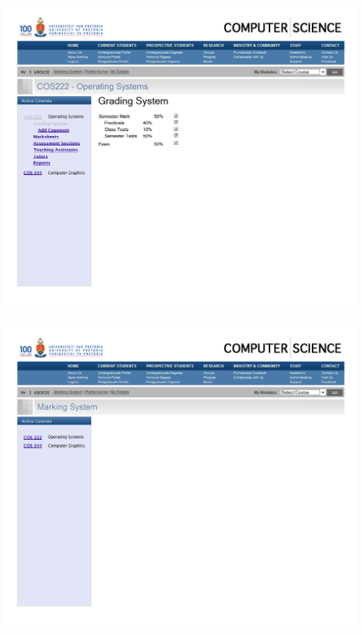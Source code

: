 \documentclass[12pt,a4paper]{article}
\begin{document}
\includegraphics[scale=0.3]{./WebUI/7.png}\\\\
\includegraphics[scale=0.3]{./WebUI/8.png}\\\\
\end{document}
